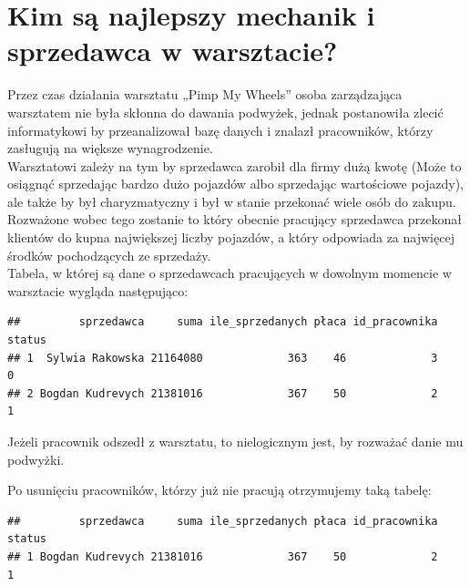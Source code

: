 \documentclass{article}\usepackage[]{graphicx}\usepackage[]{xcolor}
\makeatletter
\newenvironment{kframe}{%
 \def\at@end@of@kframe{}%
 \ifinner\ifhmode%
  \def\at@end@of@kframe{\end{minipage}}%
  \begin{minipage}{\columnwidth}%
 \fi\fi%
 \def\FrameCommand##1{\hskip\@totalleftmargin \hskip-\fboxsep
 \colorbox{shadecolor}{##1}\hskip-\fboxsep
     \hskip-\linewidth \hskip-\@totalleftmargin \hskip\columnwidth}%
 \MakeFramed {\advance\hsize-\width
   \@totalleftmargin\z@ \linewidth\hsize
   \@setminipage}}%
 {\par\unskip\endMakeFramed%
 \at@end@of@kframe}
\newenvironment{knitrout}{}{} %
\makeatother
\begin{document}
\section{Kim są najlepszy mechanik i sprzedawca w warsztacie?}

Przez czas działania warsztatu „Pimp My Wheels” osoba zarządzająca warsztatem nie była skłonna do dawania podwyżek, jednak postanowiła zlecić informatykowi by przeanalizował bazę danych i znalazł pracowników, którzy zasługują na większe wynagrodzenie. \\

Warsztatowi zależy na tym by sprzedawca zarobił dla firmy dużą kwotę (Może to osiągnąć sprzedając bardzo dużo pojazdów albo sprzedając wartościowe pojazdy), ale także by był charyzmatyczny i był w stanie przekonać wiele osób do zakupu. Rozważone wobec tego zostanie to który obecnie pracujący sprzedawca przekonał klientów do kupna największej liczby pojazdów, a który odpowiada za najwięcej środków pochodzących ze sprzedaży. \\


Tabela, w której są dane o sprzedawcach  pracujących w dowolnym momencie w warsztacie wygląda następująco:

\begin{knitrout}
\color{fgcolor}\begin{kframe}
\begin{verbatim}
##         sprzedawca     suma ile_sprzedanych płaca id_pracownika status
## 1  Sylwia Rakowska 21164080             363    46             3      0
## 2 Bogdan Kudrevych 21381016             367    50             2      1
\end{verbatim}
\end{kframe}
\end{knitrout}

Jeżeli pracownik odszedł z warsztatu, to nielogicznym jest, by rozważać danie mu podwyżki.

Po usunięciu pracowników, którzy już nie pracują otrzymujemy taką tabelę:

\begin{knitrout}
\color{fgcolor}\begin{kframe}
\begin{verbatim}
##         sprzedawca     suma ile_sprzedanych płaca id_pracownika status
## 1 Bogdan Kudrevych 21381016             367    50             2      1
\end{verbatim}
\end{kframe}
\end{knitrout}
\end{document}
